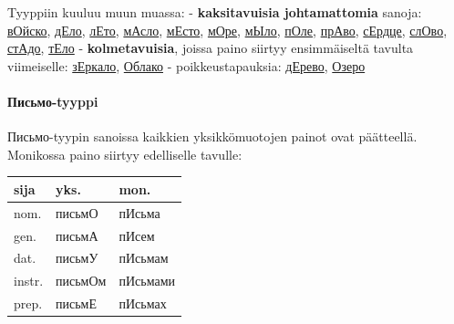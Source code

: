 \documentclass[]{scrartcl}
\begin{document}
Tyyppiin kuuluu muun muassa: - \textbf{kaksitavuisia johtamattomia}
sanoja:
\href{http://ru.wiktionary.org/wiki/\%D0\%B2\%D0\%BE\%D0\%B9\%D1\%81\%D0\%BA\%D0\%BE}{вОйско},
\href{http://ru.wiktionary.org/wiki/\%D0\%B4\%D0\%B5\%D0\%BB\%D0\%BE}{дЕло},
\href{http://ru.wiktionary.org/wiki/\%D0\%BB\%D0\%B5\%D1\%82\%D0\%BE}{лЕто},
\href{http://ru.wiktionary.org/wiki/\%D0\%BC\%D0\%B0\%D1\%81\%D0\%BB\%D0\%BE}{мАсло},
\href{http://ru.wiktionary.org/wiki/\%D0\%BC\%D0\%B5\%D1\%81\%D1\%82\%D0\%BE}{мЕсто},
\href{http://ru.wiktionary.org/wiki/\%D0\%BC\%D0\%BE\%D1\%80\%D0\%B5}{мОре},
\href{http://ru.wiktionary.org/wiki/\%D0\%BC\%D1\%8B\%D0\%BB\%D0\%BE}{мЫло},
\href{http://ru.wiktionary.org/wiki/\%D0\%BF\%D0\%BE\%D0\%BB\%D0\%B5}{пОле},
\href{http://ru.wiktionary.org/wiki/\%D0\%BF\%D1\%80\%D0\%B0\%D0\%B2\%D0\%BE}{прАво},
\href{http://ru.wiktionary.org/wiki/\%D1\%81\%D0\%B5\%D1\%80\%D0\%B4\%D1\%86\%D0\%B5}{сЕрдце},
\href{http://ru.wiktionary.org/wiki/\%D1\%81\%D0\%BB\%D0\%BE\%D0\%B2\%D0\%BE}{слОво},
\href{http://ru.wiktionary.org/wiki/\%D1\%81\%D1\%82\%D0\%B0\%D0\%B4\%D0\%BE}{стАдо},
\href{http://ru.wiktionary.org/wiki/\%D1\%82\%D0\%B5\%D0\%BB\%D0\%BE}{тЕло}
- \textbf{kolmetavuisia}, joissa paino siirtyy ensimmäiseltä tavulta
viimeiselle:
\href{http://ru.wiktionary.org/wiki/\%D0\%B7\%D0\%B5\%D1\%80\%D0\%BA\%D0\%B0\%D0\%BB\%D0\%BE}{зЕркало},
\href{http://ru.wiktionary.org/wiki/\%D0\%BE\%D0\%B1\%D0\%BB\%D0\%B0\%D0\%BA\%D0\%BE}{Облако}
- poikkeustapauksia:
\href{http://ru.wiktionary.org/wiki/\%D0\%B4\%D0\%B5\%D1\%80\%D0\%B5\%D0\%B2\%D0\%BE}{дЕрево},
\href{http://ru.wiktionary.org/wiki/\%D0\%BE\%D0\%B7\%D0\%B5\%D1\%80\%D0\%BE}{Озеро}

\paragraph{Письмо-tyyppi}\label{ux43fux438ux441ux44cux43cux43e-tyyppi}

Письмо-tyypin sanoissa kaikkien yksikkömuotojen painot ovat päätteellä.
Monikossa paino siirtyy edelliselle tavulle:

\begin{longtable}[c]{@{}lll@{}}
\toprule
sija & yks. & mon.\tabularnewline
\midrule
\endhead
nom. & письмО & пИсьма\tabularnewline
gen. & письмА & пИсем\tabularnewline
dat. & письмУ & пИсьмам\tabularnewline
instr. & письмОм & пИсьмами\tabularnewline
prep. & письмЕ & пИсьмах\tabularnewline
\bottomrule
\end{longtable}
\end{document}
